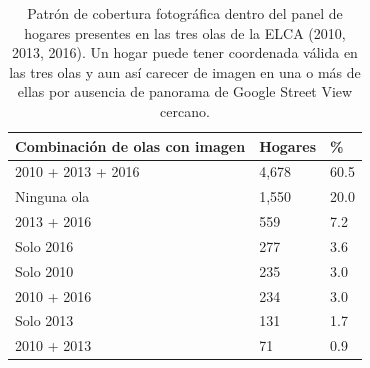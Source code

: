 \begin{table}
\caption{Patrón de cobertura fotográfica dentro del panel de hogares presentes en las tres olas de la ELCA (2010, 2013, 2016). Un hogar puede tener coordenada válida en las tres olas y aun así carecer de imagen en una o más de ellas por ausencia de panorama de Google Street View cercano.}
\label{tab:gsv_patron_cobertura}
\begin{tabular}{lll}
\toprule
Combinación de olas con imagen & Hogares & \% \\
\midrule
2010 + 2013 + 2016 & 4,678 & 60.5 \\
Ninguna ola & 1,550 & 20.0 \\
2013 + 2016 & 559 & 7.2 \\
Solo 2016 & 277 & 3.6 \\
Solo 2010 & 235 & 3.0 \\
2010 + 2016 & 234 & 3.0 \\
Solo 2013 & 131 & 1.7 \\
2010 + 2013 & 71 & 0.9 \\
\bottomrule
\end{tabular}
\end{table}
